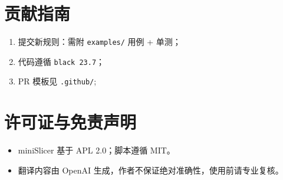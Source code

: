 \documentclass[12pt]{article}
\begin{document}
\section{贡献指南}
\begin{enumerate}
  \item 提交新规则：需附 \texttt{examples/} 用例 + 单测；
  \item 代码遵循 \texttt{black 23.7}；
  \item PR 模板见 \texttt{.github/};
\end{enumerate}

\section{许可证与免责声明}
\begin{itemize}
  \item miniSlicer 基于 APL 2.0；脚本遵循 MIT。\newline
  \item 翻译内容由 OpenAI 生成，作者不保证绝对准确性，使用前请专业复核。
\end{itemize}
\end{document}
